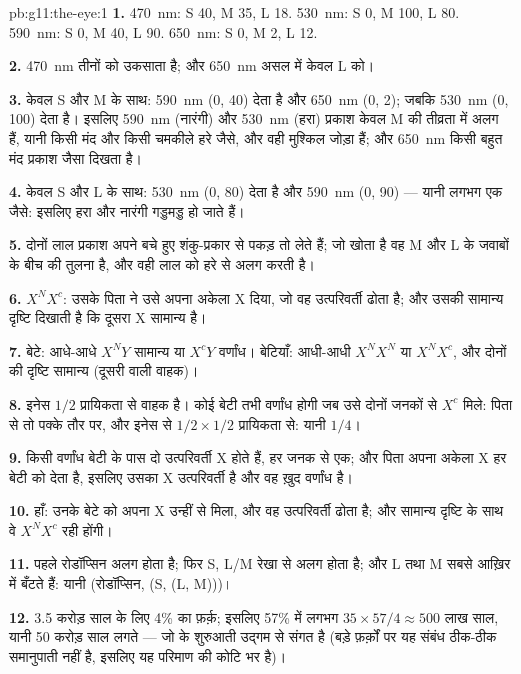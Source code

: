 \begin{solution}{pb:g11:the-eye:1}
\textbf{1.} \qty{470}{nm}: S 40, M 35, L 18. \qty{530}{nm}: S 0, M 100,
L 80. \qty{590}{nm}: S 0, M 40, L 90. \qty{650}{nm}: S 0, M 2, L 12.

\textbf{2.} \qty{470}{nm} तीनों को उकसाता है; और \qty{650}{nm} असल में
केवल L को।

\textbf{3.} केवल S और M के साथ: \qty{590}{nm} (0, 40) देता है और
\qty{650}{nm} (0, 2); जबकि \qty{530}{nm} (0, 100) देता है। इसलिए
\qty{590}{nm} (नारंगी) और \qty{530}{nm} (हरा) प्रकाश केवल M की तीव्रता में
अलग हैं, यानी किसी मंद और किसी चमकीले हरे जैसे, और वही मुश्किल जोड़ा हैं;
और \qty{650}{nm} किसी बहुत मंद प्रकाश जैसा दिखता है।

\textbf{4.} केवल S और L के साथ: \qty{530}{nm} (0, 80) देता है और
\qty{590}{nm} (0, 90) --- यानी लगभग एक जैसे: इसलिए हरा और नारंगी गड्डमड्ड
हो जाते हैं।

\textbf{5.} दोनों लाल प्रकाश अपने बचे हुए शंकु-प्रकार से पकड़ तो लेते हैं;
जो खोता है वह M और L के जवाबों के बीच की तुलना है, और वही लाल को हरे से
अलग करती है।

\textbf{6.} $X^NX^c$: उसके पिता ने उसे अपना अकेला X दिया, जो वह
उत्परिवर्ती  ढोता है; और उसकी सामान्य दृष्टि दिखाती है कि दूसरा X
सामान्य है।

\textbf{7.} बेटे: आधे-आधे $X^NY$ सामान्य या $X^cY$ वर्णांध। बेटियाँ:
आधी-आधी $X^NX^N$ या $X^NX^c$, और दोनों की दृष्टि सामान्य (दूसरी वाली
वाहक)।

\textbf{8.} इनेस $1/2$ प्रायिकता से वाहक है। कोई बेटी तभी वर्णांध होगी जब
उसे दोनों जनकों से $X^c$ मिले: पिता से तो पक्के तौर पर, और इनेस से
$1/2 \times 1/2$ प्रायिकता से: यानी $1/4$।

\textbf{9.} किसी वर्णांध बेटी के पास दो उत्परिवर्ती X  होते हैं,
हर जनक से एक; और पिता अपना अकेला X हर बेटी को देता है, इसलिए उसका X
उत्परिवर्ती है और वह ख़ुद वर्णांध है।

\textbf{10.} हाँ: उनके बेटे को अपना X उन्हीं से मिला, और वह उत्परिवर्ती
 ढोता है; और सामान्य दृष्टि के साथ वे $X^NX^c$ रही होंगी।

\textbf{11.} पहले रोडॉप्सिन अलग होता है; फिर S, L/M रेखा से अलग होता है;
और L तथा M सबसे आख़िर में बँटते हैं: यानी (रोडॉप्सिन, (S, (L, M)))।

\textbf{12.} 3.5 करोड़ साल के लिए 4\% का फ़र्क़; इसलिए 57\% में लगभग
$35 \times 57/4 \approx 500$ लाख साल, यानी 50 करोड़ साल लगते --- जो
 के शुरुआती उद्गम से संगत है (बड़े फ़र्क़ों पर यह संबंध ठीक-ठीक
समानुपाती नहीं है, इसलिए यह परिमाण की कोटि भर है)।


\end{solution}
